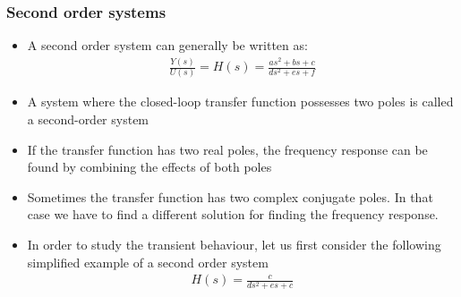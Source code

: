 \begin{frame}
\frametitle{Second order systems}
\begin{itemize}
\item A second order system can generally be written as:
\vspace{0.4cm}
\\ 
\begin{align*}
\frac{Y(s)}{U(s)}=H(s)=\frac{as^2+ bs+ c}{ds^2+ es+ f}
\end{align*}
\vspace{0.2cm}
\item A system where the closed-loop transfer function possesses two poles is called a second-order system
\vspace{0.4cm}
\item If the transfer function has two real poles, the frequency response can be found by combining the effects of both poles

\end{itemize}
\end{frame}

\begin{frame}
\begin{itemize} 
\vspace{-0.5cm}
\item Sometimes the transfer function has two complex conjugate poles. In that case we have to find a different solution for finding the frequency response.
\vspace{1cm}
\item In order to study the transient behaviour, let us first consider the following simplified example of a second order system
\\ 
\begin{align*}
H(s) = \frac{c}{ds^2+es+c}
\end {align*}
\vspace{-0.5cm}
\end{itemize}
\end{frame}

